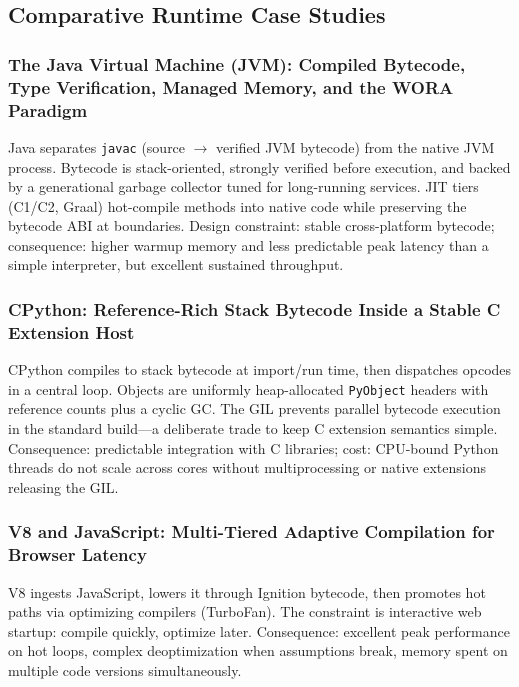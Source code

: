 \subsection{Comparative Runtime Case Studies}

\subsubsection{The Java Virtual Machine (JVM): Compiled Bytecode, Type Verification, Managed Memory, and the WORA Paradigm}

Java separates \texttt{javac} (source $\rightarrow$ verified JVM bytecode) from the native JVM process. Bytecode is stack-oriented, strongly verified before execution, and backed by a generational garbage collector tuned for long-running services. JIT tiers (C1/C2, Graal) hot-compile methods into native code while preserving the bytecode ABI at boundaries. Design constraint: stable cross-platform bytecode; consequence: higher warmup memory and less predictable peak latency than a simple interpreter, but excellent sustained throughput.

\subsubsection{CPython: Reference-Rich Stack Bytecode Inside a Stable C Extension Host}

CPython compiles to stack bytecode at import/run time, then dispatches opcodes in a central loop. Objects are uniformly heap-allocated \texttt{PyObject} headers with reference counts plus a cyclic GC. The GIL prevents parallel bytecode execution in the standard build---a deliberate trade to keep C extension semantics simple. Consequence: predictable integration with C libraries; cost: CPU-bound Python threads do not scale across cores without multiprocessing or native extensions releasing the GIL.

\subsubsection{V8 and JavaScript: Multi-Tiered Adaptive Compilation for Browser Latency}

V8 ingests JavaScript, lowers it through Ignition bytecode, then promotes hot paths via optimizing compilers (TurboFan). The constraint is interactive web startup: compile quickly, optimize later. Consequence: excellent peak performance on hot loops, complex deoptimization when assumptions break, memory spent on multiple code versions simultaneously.

